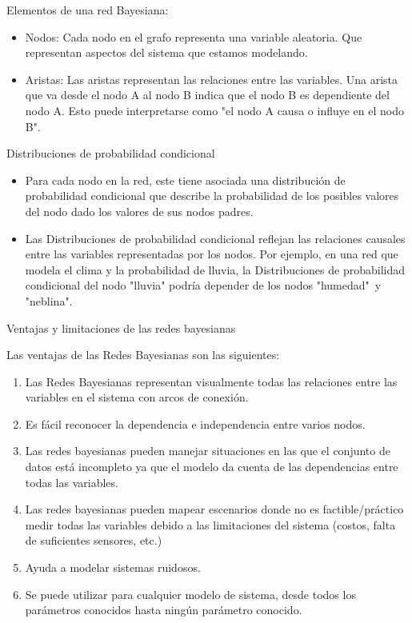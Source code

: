 Elementos de una red Bayesiana:
\begin{itemize} 
    \item Nodos: Cada nodo en el grafo representa una variable aleatoria. Que representan aspectos del sistema que estamos modelando.
    \item Aristas: Las aristas representan las relaciones entre las variables. Una arista que va desde el nodo A al nodo B indica que el nodo B es dependiente del nodo A. Esto puede interpretarse como "el nodo A causa o influye en el nodo B".
\end{itemize}

Distribuciones de probabilidad condicional

\begin{itemize}
    \item Para cada nodo en la red, este tiene asociada una distribución de probabilidad condicional que describe la probabilidad de los posibles valores del nodo dado los valores de sus nodos padres.
    \item Las Distribuciones de probabilidad condicional reflejan las relaciones causales entre las variables representadas por los nodos. Por ejemplo, en una red que modela el clima y la probabilidad de lluvia, la Distribuciones de probabilidad condicional del nodo "lluvia" podría depender de los nodos "humedad"\ y "neblina".
\end{itemize}

Ventajas y limitaciones de las redes bayesianas

Las ventajas de las Redes Bayesianas son las siguientes:

\begin{enumerate} 
    \item Las Redes Bayesianas representan visualmente todas las relaciones entre las variables en el sistema con arcos de conexión.
    \item Es fácil reconocer la dependencia e independencia entre varios nodos.
    \item Las redes bayesianas pueden manejar situaciones en las que el conjunto de datos está incompleto ya que el modelo da cuenta de las dependencias entre todas las variables.
    \item Las redes bayesianas pueden mapear escenarios donde no es factible/práctico medir todas las variables debido a las limitaciones del sistema (costos, falta de suficientes sensores, etc.)
    \item Ayuda a modelar sistemas ruidosos.
    \item Se puede utilizar para cualquier modelo de sistema, desde todos los parámetros conocidos hasta ningún parámetro conocido.
\end{enumerate}

